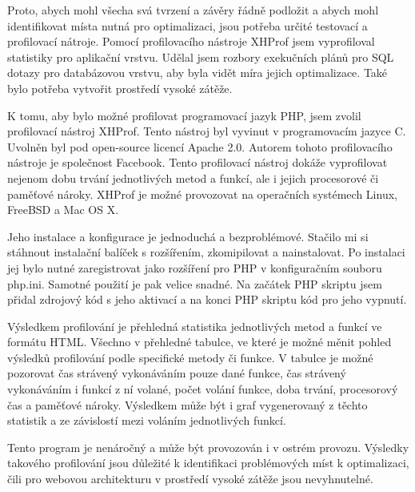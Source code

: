 \documentclass[12pt]{article}
\begin{document}
\obrazek
{}

Proto, abych mohl všecha svá tvrzení a závěry řádně podložit a abych mohl identifikovat místa nutná pro optimalizaci, jsou potřeba určité testovací a profilovací nátroje. Pomocí profilovacího nástroje XHProf jsem vyprofiloval statistiky pro aplikační vrstvu. Udělal jsem rozbory exekučních plánů pro SQL dotazy pro databázovou vrstvu, aby byla vidět míra jejich optimalizace. Také bylo potřeba vytvořit prostředí vysoké zátěže.

K tomu, aby bylo možné profilovat programovací jazyk PHP, jsem zvolil profilovací nástroj XHProf. Tento nástroj byl vyvinut v programovacím jazyce C. Uvolněn byl pod open-source licencí Apache 2.0. Autorem tohoto profilovacího nástroje je společnost Facebook. Tento profilovací nástroj dokáže vyprofilovat nejenom dobu trvání jednotlivých metod a funkcí, ale i jejich procesorové či paměťové nároky. XHProf je možné provozovat na operačních systémech Linux, FreeBSD a Mac OS X.

Jeho instalace a konfigurace je jednoduchá a bezproblémové. Stačilo mi si stáhnout instalační balíček s rozšířením, zkomipilovat a nainstalovat. Po instalaci jej bylo nutné zaregistrovat jako rozšíření pro PHP v konfiguračním souboru php.ini. Samotné použití je pak velice snadné. Na začátek PHP skriptu jsem přidal zdrojový kód s jeho aktivací a na konci PHP skriptu kód pro jeho vypnutí.

Výsledkem profilování je přehledná statistika jednotlivých metod a funkcí ve formátu HTML. Všechno v přehledné tabulce, ve které je možné měnit pohled výsledků profilování podle specifické metody či funkce. V tabulce je možné pozorovat čas strávený vykonáváním pouze dané funkce, čas strávený vykonáváním i funkcí z ní volané, počet volání funkce, doba trvání, procesorový čas a paměťové nároky. Výsledkem může být i graf vygenerovaný z těchto statistik a ze závislostí mezi voláním jednotlivých funkcí.

Tento program je nenáročný a může být provozován i v ostrém provozu. Výsledky takového profilování jsou důležité k identifikaci problémových míst k optimalizaci, čili pro webovou architekturu v prostředí vysoké zátěže jsou nevyhnutelné.\cite{xhprof}
\end{document}
